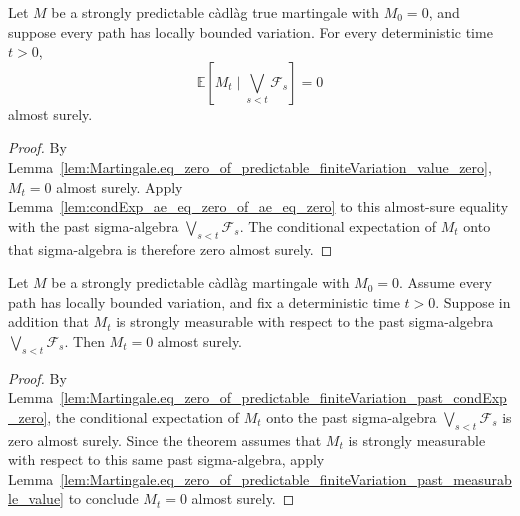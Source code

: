 \begin{lemma}\label{lem:Martingale.eq_zero_of_predictable_finiteVariation_past_condExp_zero}
Let \(M\) be a strongly predictable càdlàg true martingale with \(M_0=0\),
and suppose every path has locally bounded variation.  For every
deterministic time \(t>0\),
\[
  \mathbb E[M_t\mid \bigvee_{s<t}\mathcal F_s]=0
\]
almost surely.
\end{lemma}

\begin{proof}
By
Lemma~\ref{lem:Martingale.eq_zero_of_predictable_finiteVariation_value_zero},
\(M_t=0\) almost surely.  Apply
Lemma~\ref{lem:condExp_ae_eq_zero_of_ae_eq_zero} to this almost-sure equality
with the past sigma-algebra \(\bigvee_{s<t}\mathcal F_s\).  The conditional
expectation of \(M_t\) onto that sigma-algebra is therefore zero almost
surely.
\end{proof}


\begin{theorem}\label{thm:Martingale.eq_zero_of_predictable_finiteVariation_noninitial_analytic}
Let \(M\) be a strongly predictable càdlàg martingale with \(M_0=0\).
Assume every path has locally bounded variation, and fix a deterministic time
\(t>0\).  Suppose in addition that \(M_t\) is strongly measurable with
respect to the past sigma-algebra \(\bigvee_{s<t}\mathcal F_s\).  Then
\(M_t=0\) almost surely.
\end{theorem}

\begin{proof}
By
Lemma~\ref{lem:Martingale.eq_zero_of_predictable_finiteVariation_past_condExp_zero},
the conditional expectation of \(M_t\) onto the past sigma-algebra
\(\bigvee_{s<t}\mathcal F_s\) is zero almost surely.  Since the theorem
assumes that \(M_t\) is strongly measurable with respect to this same
past sigma-algebra, apply
Lemma~\ref{lem:Martingale.eq_zero_of_predictable_finiteVariation_past_measurable_value}
to conclude \(M_t=0\) almost surely.
\end{proof}


